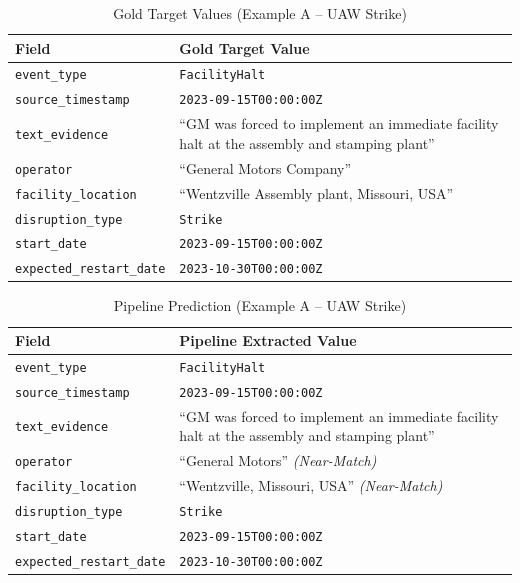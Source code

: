 \documentclass[11pt,a4paper]{article}
\begin{document}
\begin{table}[htbp]
\centering
\caption{Gold Target Values (Example A -- UAW Strike)}
\label{tab:ex_a_gold}
\begin{tabular}{@{}p{3.8cm} p{8.7cm}@{}}
\toprule
\textbf{Field} & \textbf{Gold Target Value} \\
\midrule
\texttt{event\_type} & \texttt{FacilityHalt} \\
\texttt{source\_timestamp} & \texttt{2023-09-15T00:00:00Z} \\
\texttt{text\_evidence} & ``GM was forced to implement an immediate facility halt at the assembly and stamping plant'' \\
\texttt{operator} & ``General Motors Company'' \\
\texttt{facility\_location} & ``Wentzville Assembly plant, Missouri, USA'' \\
\texttt{disruption\_type} & \texttt{Strike} \\
\texttt{start\_date} & \texttt{2023-09-15T00:00:00Z} \\
\texttt{expected\_restart\_date} & \texttt{2023-10-30T00:00:00Z} \\
\bottomrule
\end{tabular}
\end{table}

\begin{table}[htbp]
\centering
\caption{Pipeline Prediction (Example A -- UAW Strike)}
\label{tab:ex_a_pred}
\begin{tabular}{@{}p{3.8cm} p{8.7cm}@{}}
\toprule
\textbf{Field} & \textbf{Pipeline Extracted Value} \\
\midrule
\texttt{event\_type} & \texttt{FacilityHalt} \\
\texttt{source\_timestamp} & \texttt{2023-09-15T00:00:00Z} \\
\texttt{text\_evidence} & ``GM was forced to implement an immediate facility halt at the assembly and stamping plant'' \\
\texttt{operator} & ``General Motors'' \textit{(Near-Match)} \\
\texttt{facility\_location} & ``Wentzville, Missouri, USA'' \textit{(Near-Match)} \\
\texttt{disruption\_type} & \texttt{Strike} \\
\texttt{start\_date} & \texttt{2023-09-15T00:00:00Z} \\
\texttt{expected\_restart\_date} & \texttt{2023-10-30T00:00:00Z} \\
\bottomrule
\end{tabular}
\end{table}
\end{document}
